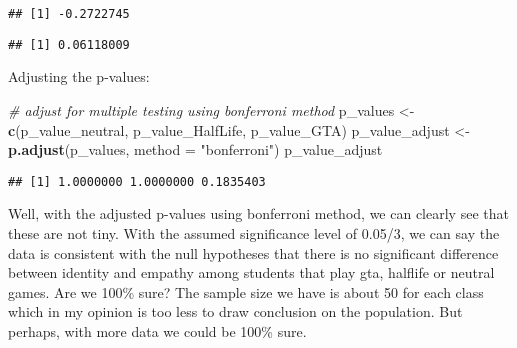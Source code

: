\documentclass[
]{article}
\newenvironment{Shaded}{\begin{snugshade}}{\end{snugshade}}
\newcommand{\AttributeTok}[1]{\textcolor[rgb]{0.13,0.29,0.53}{#1}}
\newcommand{\CommentTok}[1]{\textcolor[rgb]{0.56,0.35,0.01}{\textit{#1}}}
\newcommand{\FunctionTok}[1]{\textcolor[rgb]{0.13,0.29,0.53}{\textbf{#1}}}
\newcommand{\NormalTok}[1]{#1}
\newcommand{\OtherTok}[1]{\textcolor[rgb]{0.56,0.35,0.01}{#1}}
\newcommand{\SpecialCharTok}[1]{\textcolor[rgb]{0.81,0.36,0.00}{\textbf{#1}}}
\newcommand{\StringTok}[1]{\textcolor[rgb]{0.31,0.60,0.02}{#1}}
\begin{document}
\begin{Shaded}
\end{Shaded}

\begin{verbatim}
## [1] -0.2722745
\end{verbatim}

\begin{Shaded}
\end{Shaded}

\begin{verbatim}
## [1] 0.06118009
\end{verbatim}

Adjusting the p-values:

\begin{Shaded}
\begin{Highlighting}[]
\CommentTok{\#  adjust for multiple testing using bonferroni method}
\NormalTok{p\_values }\OtherTok{\textless{}{-}} \FunctionTok{c}\NormalTok{(p\_value\_neutral, p\_value\_HalfLife, p\_value\_GTA)}
\NormalTok{p\_value\_adjust }\OtherTok{\textless{}{-}} \FunctionTok{p.adjust}\NormalTok{(p\_values, }\AttributeTok{method =} \StringTok{"bonferroni"}\NormalTok{)}
\NormalTok{p\_value\_adjust}
\end{Highlighting}
\end{Shaded}

\begin{verbatim}
## [1] 1.0000000 1.0000000 0.1835403
\end{verbatim}

Well, with the adjusted p-values using bonferroni method, we can clearly
see that these are not tiny. With the assumed significance level of
0.05/3, we can say the data is consistent with the null hypotheses that
there is no significant difference between identity and empathy among
students that play gta, halflife or neutral games. Are we 100\% sure?
The sample size we have is about 50 for each class which in my opinion
is too less to draw conclusion on the population. But perhaps, with more
data we could be 100\% sure.
\end{document}
